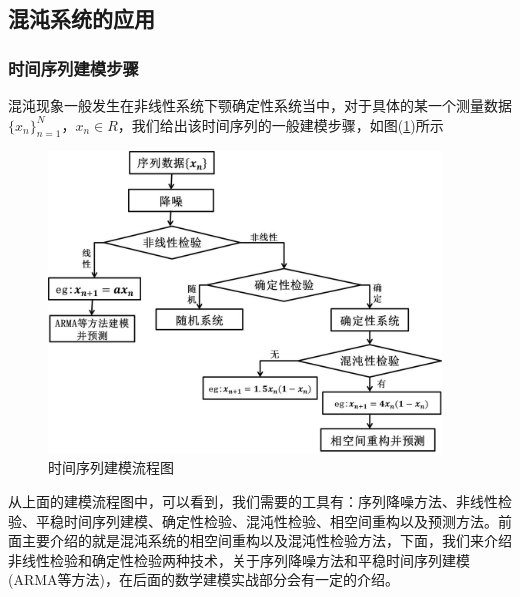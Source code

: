     \subsection{混沌系统的应用}
        \subsubsection{时间序列建模步骤}
            \par
            混沌现象一般发生在非线性系统下颚确定性系统当中，对于具体的某一个测量数据$\{x_n\}_{n = 1}^N$，$x_n \in R$，我们给出该时间序列的一般建模步骤，如图(\ref{fig:时间序列建模流程图})所示
         \begin{figure}[H]
        \centering
        \includegraphics[height=8cm]{images/Time_series_modeling.jpg}
        \caption{时间序列建模流程图}
        \label{fig:时间序列建模流程图}
        \end{figure}
            \par
            从上面的建模流程图中，可以看到，我们需要的工具有：序列降噪方法、非线性检验、平稳时间序列建模、确定性检验、混沌性检验、相空间重构以及预测方法。前面主要介绍的就是混沌系统的相空间重构以及混沌性检验方法，下面，我们来介绍非线性检验和确定性检验两种技术，关于序列降噪方法和平稳时间序列建模(ARMA等方法)，在后面的数学建模实战部分会有一定的介绍。
